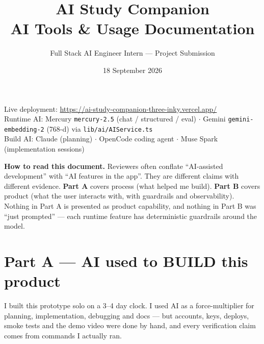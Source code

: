 \documentclass[11pt,a4paper]{article}
\title{AI Study Companion\\AI Tools \& Usage Documentation}
\author{Full Stack AI Engineer Intern --- Project Submission}
\date{18 September 2026}
\begin{document}
\maketitle

\noindent Live deployment: \url{https://ai-study-companion-three-inky.vercel.app/}\\
Runtime AI: Mercury \texttt{mercury-2.5} (chat / structured / eval) $\cdot$ Gemini \texttt{gemini-embedding-2} (768-d) via \texttt{lib/ai/AIService.ts}\\
Build AI: Claude (planning) $\cdot$ OpenCode coding agent $\cdot$ Muse Spark (implementation sessions)

\tableofcontents
\newpage

\begin{shaded}
\noindent\textbf{How to read this document.}
Reviewers often conflate ``AI-assisted development'' with ``AI features in the app''.
They are different claims with different evidence.
\textbf{Part A} covers process (what helped me build).
\textbf{Part B} covers product (what the user interacts with, with guardrails and observability).
Nothing in Part A is presented as product capability, and nothing in Part B was ``just prompted'' ---
each runtime feature has deterministic guardrails around the model.
\end{shaded}

\section{Part A --- AI used to BUILD this product}

I built this prototype solo on a 3--4 day clock. I used AI as a force-multiplier for planning,
implementation, debugging and docs --- but accounts, keys, deploys, smoke tests and the demo
video were done by hand, and every verification claim comes from commands I actually ran.
\end{document}
